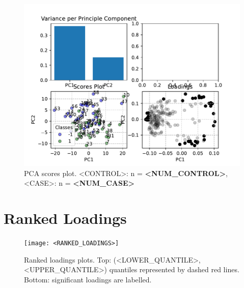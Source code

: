 \documentclass[]{article}
\begin{document}
    \begin{figure}[h!]
        \begin{center}
            \includegraphics{<SUMMARY_FIGS>}
        \end{center}
        \caption{PCA scores plot. <CONTROL>: n = \textbf{<NUM_CONTROL>}, <CASE>: n = \textbf{<NUM_CASE>}}
    \end{figure}

\newpage

\section*{Ranked Loadings}

    \begin{figure}[h!]
        \begin{center}
            \texttt{[image: <RANKED\_LOADINGS>]}
        \end{center}
        \caption{Ranked loadings plots. Top: (<LOWER_QUANTILE>, <UPPER_QUANTILE>) quantiles
        represented by dashed red lines. Bottom: significant loadings are labelled.}
    \end{figure}

\end{document}
